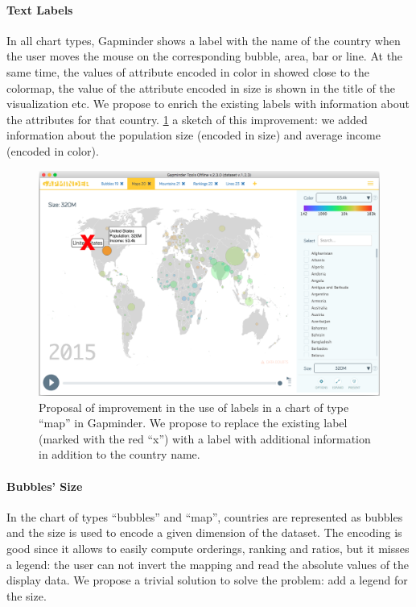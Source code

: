 \paragraph{Text Labels}
In all chart types, Gapminder shows a label with the name of the country when the user moves the mouse on the corresponding bubble, area, bar or line.
At the same time, the values of attribute encoded in color in showed close to the colormap, the value of the attribute encoded in size is shown in the title of the visualization etc.
We propose to enrich the existing labels with information about the attributes for that country.
\cref{fig:labels-custom} a sketch of this improvement:
we added information about the population size (encoded in size) and average income (encoded in color).

\begin{figure}[h]
	\centering
	\includegraphics[width=0.95\columnwidth]{figures/labels-custom}
	\caption{Proposal of improvement in the use of labels in a chart of type ``map'' in Gapminder. We propose to replace the existing label (marked with the red ``x'') with a label with additional information in addition to the country name.}
	\label{fig:labels-custom}
\end{figure}

\paragraph{Bubbles' Size}
In the chart of types ``bubbles'' and ``map'', countries are represented as bubbles and the size is used to encode a given dimension of the dataset.
The encoding is good since it allows to easily compute orderings, ranking and ratios, but it misses a legend:
the user can not invert the mapping and read the absolute values of the display data.
We propose a trivial solution to solve the problem: add a legend for the size.

